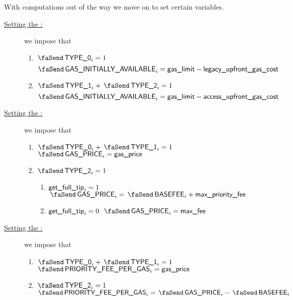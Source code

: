 \begin{center}
\end{center}
With computations out of the way we move on to set certain variables.
\begin{description}
        \item[\underline{Setting the \txInitialGas:}] 
                we impose that
                \begin{enumerate}
                        \item \If $\txIsLegacy _{i} = 1$ \Then
                                \[ \txInitialGas  _{i} = \locGasLimit - \locLegacyUpfrontGasCost \]
                        \item \If $\txIsAccessSet _{i} + \txIsTypeTwo _{i} = 1$ \Then
                                \[ \txInitialGas  _{i} = \locGasLimit - \locAccessUpfrontGasCost \]
                \end{enumerate}
        \item[\underline{Setting the \txGasPrice:}] 
                we impose that
                \begin{enumerate}
                        \item \If $\txIsLegacy _{i} + \txIsAccessSet _{i} = 1$ \Then $\txGasPrice  _{i} = \locGasPrice$
                        \item \If $\txIsTypeTwo_{i} = 1$ \Then
                                \begin{enumerate}
                                        \item \If $\textsf{get\_full\_tip}_{i} = 1$ \Then $\txGasPrice  _{i} = \txBasefee_{i} + \locMaxPriorityFee$
                                        \item \If $\textsf{get\_full\_tip}_{i} = 0$ \Then $\txGasPrice  _{i} = \locMaxFee$
                                \end{enumerate}
                \end{enumerate}
        \item[\underline{Setting the \txPriorityFeePerGas:}] 
                we impose that
                \begin{enumerate}
                        \item \If $\txIsLegacy _{i} + \txIsAccessSet _{i} = 1$ \Then $\txPriorityFeePerGas  _{i} = \locGasPrice$
                        \item \If $\txIsTypeTwo_{i} = 1$ \Then $\txPriorityFeePerGas  _{i} = \txGasPrice_{i} - \txBasefee_{i}$

\end{enumerate}
\end{description}
